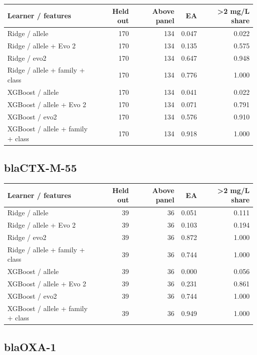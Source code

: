\documentclass[
  10pt,
]{article}
\newcounter{none} %
\begin{document}
{\def\LTcaptype{none} %
\begin{longtable}[]{@{}lrrrr@{}}
\toprule\noalign{}
Learner / features & Held out & Above panel & EA & \textgreater2 mg/L
share \\
\midrule\noalign{}
\endhead
\bottomrule\noalign{}
\endlastfoot
Ridge / allele & 170 & 134 & 0.047 & 0.022 \\
Ridge / allele + Evo 2 & 170 & 134 & 0.135 & 0.575 \\
Ridge / evo2 & 170 & 134 & 0.647 & 0.948 \\
Ridge / allele + family + class & 170 & 134 & 0.776 & 1.000 \\
XGBoost / allele & 170 & 134 & 0.041 & 0.022 \\
XGBoost / allele + Evo 2 & 170 & 134 & 0.071 & 0.791 \\
XGBoost / evo2 & 170 & 134 & 0.576 & 0.910 \\
XGBoost / allele + family + class & 170 & 134 & 0.918 & 1.000 \\
\end{longtable}
}

\subsection{blaCTX-M-55}\label{blactx-m-55}

{\def\LTcaptype{none} %
\begin{longtable}[]{@{}lrrrr@{}}
\toprule\noalign{}
Learner / features & Held out & Above panel & EA & \textgreater2 mg/L
share \\
\midrule\noalign{}
\endhead
\bottomrule\noalign{}
\endlastfoot
Ridge / allele & 39 & 36 & 0.051 & 0.111 \\
Ridge / allele + Evo 2 & 39 & 36 & 0.103 & 0.194 \\
Ridge / evo2 & 39 & 36 & 0.872 & 1.000 \\
Ridge / allele + family + class & 39 & 36 & 0.744 & 1.000 \\
XGBoost / allele & 39 & 36 & 0.000 & 0.056 \\
XGBoost / allele + Evo 2 & 39 & 36 & 0.231 & 0.861 \\
XGBoost / evo2 & 39 & 36 & 0.744 & 1.000 \\
XGBoost / allele + family + class & 39 & 36 & 0.949 & 1.000 \\
\end{longtable}
}

\subsection{blaOXA-1}\label{blaoxa-1}
\end{document}
